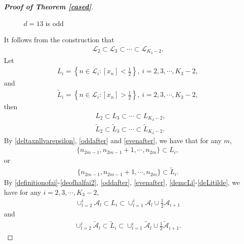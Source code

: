 \documentclass[12pt]{amsart}
\theoremstyle{plain}
\theoremstyle{definition}
\begin{document}
\begin{proof}[\textbf{Proof of Theorem \ref{cased}}]
\begin{figure}[H]
\begin{tikzpicture}[x=0.75pt,y=0.75pt,yscale=-1,xscale=1]
		
	\end{tikzpicture}
	\caption{$d=13$ is odd}
	\label{figcdoddd}
\end{figure}

It follows from the construction that
\begin{align}
	\mathcal{L}_2\subset \mathcal{L}_3\subset\cdots\subset\mathcal{L}_{K_3-2}.\nonumber
\end{align}
Let
\begin{align}
L_i=\left\{n\in \mathcal{L}_i:\left[x_n\right]<\frac{1}{2}\right\},\ i=2,3,\cdots,K_3-2,\label{deLi}
\end{align}
and 
\begin{align}
	\tilde{L}_i=\left\{n\in\mathcal{L}_i:\left[x_n\right]>\frac{1}{2}\right\},\ i=2,3,\cdots,K_3-2,\label{deLitilde}
\end{align}
then 
\begin{align}
	&L_2\subset L_3\subset \cdots\subset L_{K_3-2},\label{subl2k2}\\
	&\tilde{L}_2\subset \tilde{L}_3\subset \cdots\subset \tilde{L}_{K_3-2}.\label{subl2k23}
\end{align}
By \eqref{deltaxnllvarepsilon}, \eqref{oddafter} and \eqref{evenafter}, we have that for any $m$,
\begin{align}
\{n_{2m-1},n_{2m-1}+1,\cdots,n_{2m}\}\subset L_i,\label{wholeLi}
\end{align}
or
\begin{align}
\{n_{2m-1},n_{2m-1}+1,\cdots,n_{2m}\}\subset \tilde{L}_i.\label{wholeLitilde}
\end{align}
By \eqref{definitionofai}-\eqref{deofhalfai2}, \eqref{oddafter}, \eqref{evenafter}, \eqref{demcLi}-\eqref{deLitilde}, we have
for any $i=2,3,\cdots,K_3-2,$
\begin{align}
\label{subsetALA}\cup_{l=2}^i\mathcal{A}_l\subset L_i\subset \cup_{l=1}^{i}\mathcal{A}_l\cup\frac{1}{2}\mathcal{A}_{i+1}
\end{align}
and
\begin{align} 
	\cup_{l=2}^i\tilde{\mathcal{A}}_l\subset \tilde{L}_i\subset\cup_{l=1}^{i}\tilde{\mathcal{A}}_l\cup\frac{1}{2}\tilde{\mathcal{A}}_{i+1}.\label{subsetALAtilde}
\end{align}


\end{proof}
\end{document}
